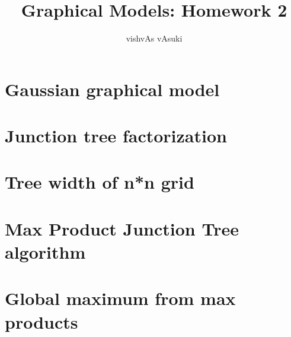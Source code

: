 \documentclass{article}
\title{Graphical Models: Homework 2}
\author{vishvAs vAsuki}
\begin{document}
\maketitle

\section{Gaussian graphical model}

\section{Junction tree factorization}

\section{Tree width of n*n grid}

\section{Max Product Junction Tree algorithm}

\section{Global maximum from max products}


% 
% 
\end{document}
